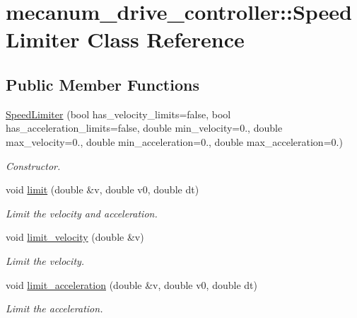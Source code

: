 \hypertarget{classmecanum__drive__controller_1_1SpeedLimiter}{}\section{mecanum\+\_\+drive\+\_\+controller\+:\+:Speed\+Limiter Class Reference}
\label{classmecanum__drive__controller_1_1SpeedLimiter}
\subsection*{Public Member Functions}
\begin{DoxyCompactItemize}
\item 
\hyperlink{classmecanum__drive__controller_1_1SpeedLimiter_a560d3c524c45294c6996145b5d3ff7c6}{Speed\+Limiter} (bool has\+\_\+velocity\+\_\+limits=false, bool has\+\_\+acceleration\+\_\+limits=false, double min\+\_\+velocity=0., double max\+\_\+velocity=0., double min\+\_\+acceleration=0., double max\+\_\+acceleration=0.)
\begin{DoxyCompactList}\small\item\em Constructor. \end{DoxyCompactList}\item 
void \hyperlink{classmecanum__drive__controller_1_1SpeedLimiter_a648a5d296d9275e5be8f10744dce16ba}{limit} (double \&v, double v0, double dt)
\begin{DoxyCompactList}\small\item\em Limit the velocity and acceleration. \end{DoxyCompactList}\item 
void \hyperlink{classmecanum__drive__controller_1_1SpeedLimiter_ab7de185ae135affae6f9a7acfb60247c}{limit\+\_\+velocity} (double \&v)
\begin{DoxyCompactList}\small\item\em Limit the velocity. \end{DoxyCompactList}\item 
void \hyperlink{classmecanum__drive__controller_1_1SpeedLimiter_a51b27d6e45d3d2ba9b7adab1c85cbcd0}{limit\+\_\+acceleration} (double \&v, double v0, double dt)
\begin{DoxyCompactList}\small\item\em Limit the acceleration. \end{DoxyCompactList}\end{DoxyCompactItemize}

